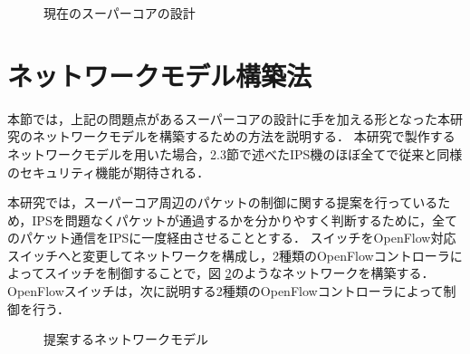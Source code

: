 \begin{figure}[tb]
	\begin{center}
		\caption{現在のスーパーコアの設計}
		\label{fig:3-0}
	\end{center}
\end{figure}

\section{ネットワークモデル構築法}

本節では，上記の問題点があるスーパーコアの設計に手を加える形となった本研究のネットワークモデルを構築するための方法を説明する．
本研究で製作するネットワークモデルを用いた場合，2.3節で述べたIPS機のほぼ全てで従来と同様のセキュリティ機能が期待される．

本研究では，スーパーコア周辺のパケットの制御に関する提案を行っているため，IPSを問題なくパケットが通過するかを分かりやすく判断するために，全てのパケット通信をIPSに一度経由させることとする．
スイッチをOpenFlow対応スイッチへと変更してネットワークを構成し，2種類のOpenFlowコントローラによってスイッチを制御することで，図 \ref{fig:3-1}のようなネットワークを構築する．
OpenFlowスイッチは，次に説明する2種類のOpenFlowコントローラによって制御を行う．

\begin{figure}[tb]
	\begin{center}
		\caption{提案するネットワークモデル}
		\label{fig:3-1}
	\end{center}
\end{figure}

